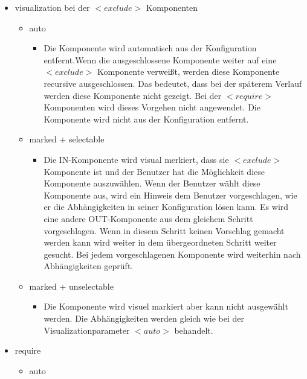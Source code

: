 \documentclass{article}
\begin{document}
\begin{itemize} 
    \item visualization bei der $<exclude>$ Komponenten
    \begin{itemize}
        \item auto 
        \begin{itemize}
            \item Die Komponente wird automatisch aus der Konfiguration
            entfernt.Wenn die ausgeschlossene Komponente weiter auf
            eine $<exclude>$ Komponente verweißt, werden diese Komponente 
            recursive ausgeschlossen. Das 
            bedeutet, dass bei der späterem Verlauf werden diese
            Komponente nicht gezeigt. Bei der $<require>$ Komponenten
            wird dieses Vorgehen nicht angewendet. Die Komponente wird nicht aus der 
            Konfiguration entfernt.
        \end{itemize}
        \item marked + selectable
        \begin{itemize}
            \item Die IN-Komponente wird visual merkiert, dass sie
            $<exclude>$ Komponente ist und der Benutzer hat die
            Möglichkeit diese Komponente auszuwählen.
            Wenn der Benutzer wählt diese Komponente aus, wird ein
            Hinweis dem Benutzer vorgeschlagen, wie er die Abhängigkeiten
            in seiner Konfiguration lösen kann. Es wird eine andere
            OUT-Komponente aus dem gleichem Schritt vorgeschlagen. Wenn in
            diesem Schritt keinen Vorschlag gemacht werden kann wird weiter
            in dem übergeordneten Schritt weiter gesucht. Bei jedem
            vorgeschlagenen Komponente wird weiterhin nach Abhängigkeiten
            geprüft.
        \end{itemize}
        \item marked + unselectable
        \begin{itemize}
            \item Die Komponente wird visuel markiert aber kann nicht
            ausgewählt werden. Die Abhängigkeiten werden gleich wie bei der
            Visualizationparameter $<auto>$ behandelt.
        \end{itemize}
    \end{itemize}
    \item require
    \begin{itemize}
        \item auto
        \begin{itemize}

\end{itemize}
\end{itemize}
\end{itemize}
\end{document}
